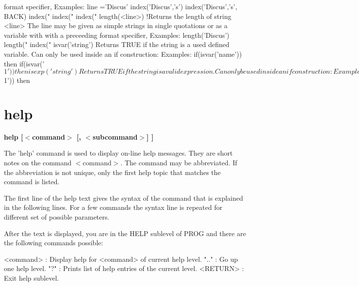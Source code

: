 \begin{MacVerbatim}
                                  format specifier, Examples:
                                  line ='Discus'
                                  index('Discus','s')
                                  index('Discus','s', BACK)
                                  index("%
                                  index("%
                                  index("%
length(<line>)                    !Returns the length of string <line>
                                  The line may be
                                  given as simple strings in single quotations
                                  or as a variable with with a preceeding
                                  format specifier, Examples:
                                  length('Discus')
                                  length("%
                                  index("%
isvar('string')                   Returns TRUE if the string is a used
                                  defined variable. Can only be used inside
                                  an if construction:
                                  Examples:
                                  if(isvar('name')) then
                                  if(isvar('$1')) then
isexp('string')                   Returns TRUE if the string is a valid
                                  expression. Can only be used inside
                                  an if construction:
                                  Examples:
                                  if(isexp('3+5.')) then
                                  if(isexp('$1')) then
\end{MacVerbatim}
\section{help}
{\bf help [$ <$command$> $ [, $ <$subcommand$> $] ] \par }
\par
\vspace{3pt}
The 'help' command is used to display on-line help messages. They are 
short notes on the command $ <$command$> $. The command may be abbreviated. 
If the abbreviation is not unique, only the first help topic that matches 
the command is listed. 
\par
The first line of the help text gives the syntax of the command that is 
explained in the following lines. For a few commands the syntax line is 
repeated for different set of possible parameters. 
\par
After the text is displayed, you are in the HELP sublevel of PROG 
and there are the following commands possible: 
\par
\begin{MacVerbatim}
<command> : Display help for <command> of current help level.
".."      : Go up one help level.
"?"       : Prints list of help entries of the current level.
<RETURN>  : Exit help sublevel.
\end{MacVerbatim}
